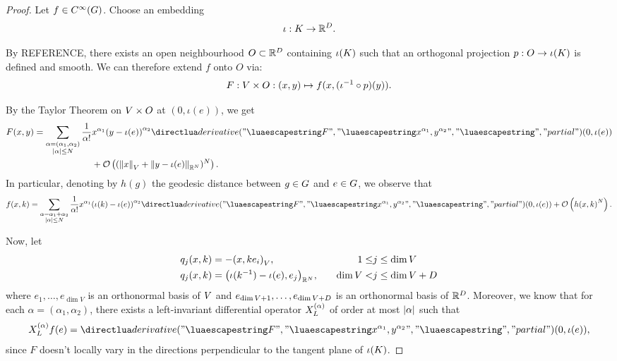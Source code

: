 \begin{proof}
    Let $f \in \SmoothFunctions\Group$.
    Choose an embedding
    \begin{align*}
        \iota : \CompactGroup \to \R^D.
    \end{align*}

    By REFERENCE, there exists an open neighbourhood $O \subset \R^D$ containing $\iota(\CompactGroup)$
    such that an orthogonal projection $p : O \to \iota(\CompactGroup)$ is defined and smooth.
    We can therefore extend $f$ onto $O$ via:
    \begin{align*}
        F : \VectorSpace \times O : (x, y) \mapsto f(x, (\iota^{-1} \circ p)(y)).
    \end{align*}

    By the Taylor Theorem on $\VectorSpace \times O$ at $(0, \iota(e))$, we get
    \begin{align*}
        F(x, y) =
        \sum_{\substack{\alpha = (\alpha_1, \alpha_2)\\ \abs\alpha \leq N}}
            \frac{1}{\alpha!}
            &x^{\alpha_1} {(y - \iota(e))}^{\alpha_2}
            \D[F]{x^{\alpha_1}, y^{\alpha_2}}(0, \iota(e))\\
            &+ \BigO\left((\norm{x} + \norm[\R^N]{y - \iota(e)})^N\right).
    \end{align*}
    In particular, denoting by $h(g)$ the geodesic distance between $g \in \Group$ and $e \in \Group$,
    we observe that
    \begin{align}
        f(x, k) =
        \sum_{\substack{\alpha = \alpha_1 + \alpha_2\\ \abs\alpha \leq N}}
            \frac{1}{\alpha!}
            x^{\alpha_1} {(\iota(k) - \iota(e))}^{\alpha_2}
            \D[F]{x^{\alpha_1}, y^{\alpha_2}}(0, \iota(e))
            + \BigO\left({h(x, k)}^N\right).
        \label{proposition:Taylor_remainder_theorem:Taylor_development}
    \end{align}

    Now, let
    \begin{align*}
        q_j(x, k) &= -\ip{x}{k e_i}, \quad &1 \leq &j \leq \dim \VectorSpace\\
        q_j(x, k) &= \ip[\R^N]{\iota(k^{-1}) - \iota(e)}{e_{j}}, \quad &\dim \VectorSpace < &j \leq \dim \VectorSpace + D
    \end{align*}
    where $e_1, \dots, e_{\dim V}$ is an orthonormal basis of $\VectorSpace$
    and $e_{\dim V + 1}, \dots, e_{\dim \VectorSpace + D}$ is an orthonormal basis of $\R^D$.
    Moreover, we know that for each $\alpha = (\alpha_1, \alpha_2)$,
    there exists a left-invariant differential operator $\TaylorLeftDifferentialOperator{\alpha}$ of order at most $\abs\alpha$ such that
    \begin{align*}
        \TaylorLeftDifferentialOperator{\alpha} f(e) = \D[F]{x^{\alpha_1}, y^{\alpha_2}}(0, \iota(e)),
    \end{align*}
    since $F$ doesn't locally vary in the directions perpendicular to the tangent plane of $\iota(\CompactGroup)$.


\end{proof}
